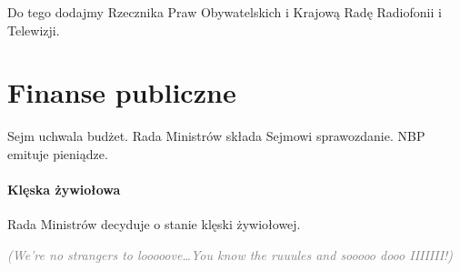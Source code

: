 \documentclass [a4paper, 12pt, oneside]{article}
\newcommand{\comment}[1]{\textcolor{Gray}{\textsf{\emph{(#1)}}}}
\begin{document}
    Do tego dodajmy Rzecznika Praw Obywatelskich i Krajową Radę Radiofonii i Telewizji.

\section{Finanse publiczne} %
\label{sec:finanse_publiczne}
    Sejm uchwala budżet. Rada Ministrów składa Sejmowi sprawozdanie. NBP emituje pieniądze.

\paragraph{Klęska żywiołowa} Rada Ministrów decyduje o stanie klęski żywiołowej.

\comment{We're no strangers to looooove\dots You know the ruuules and sooooo dooo IIIIIII!}
\end{document}
